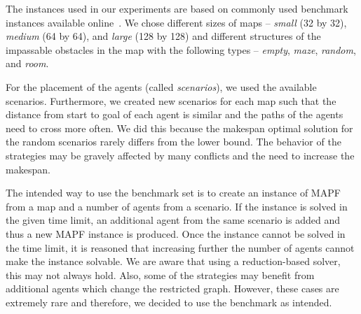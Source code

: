 The instances used in our experiments are based on commonly used benchmark instances available online~\cite{stern2019mapfVarians}. We chose different sizes of maps -- \emph{small} (32 by 32), \emph{medium} (64 by 64), and \emph{large} (128 by 128) and different structures of the impassable obstacles in the map with the following types -- \emph{empty}, \emph{maze}, \emph{random}, and \emph{room}. %


For the placement of the agents (called \emph{scenarios}), we used the available scenarios. %
Furthermore, we created new scenarios for each map such that the distance from start to goal of each agent is similar and the paths of the agents need to cross more often. We did this because the makespan optimal solution for the random scenarios rarely differs from the lower bound. %
The behavior of the strategies may be gravely affected by many conflicts and the need to increase the makespan.%

The intended way to use the benchmark set is to create an instance of MAPF from a map and a number of agents from a scenario. If the instance is solved in the given time limit, an additional agent from the same scenario is added and thus a new MAPF instance is produced. Once the instance cannot be solved in the time limit, it is reasoned that increasing further the number of agents cannot make the instance solvable. We are aware that using a reduction-based solver, this may not always hold. Also, some of the strategies may benefit from additional agents which change the restricted graph. However, these cases are extremely rare and therefore, we decided to use the benchmark as intended.


